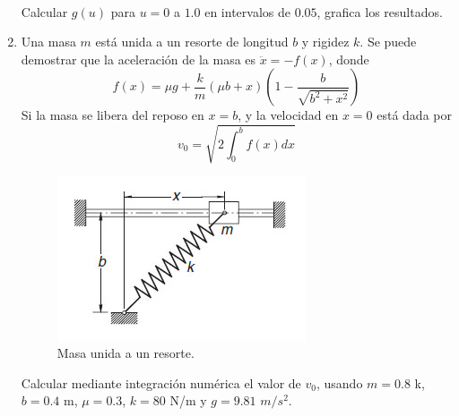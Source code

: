 \documentclass[11pt]{article}
\begin{document}
\begin{enumerate}
\begin{minipage}{4cm}
\end{minipage}
\\
Calcular $g(u)$ para $u=0$ a $1.0$ en intervalos de $0.05$, grafica los resultados.
\item Una masa $m$ est\'{a} unida a un resorte de longitud $b$ y rigidez $k$. Se puede demostrar que la aceleración de la masa es $\ddot{x} = -f(x)$, donde
\[f(x) = \mu g + \dfrac{k}{m} (\mu b + x) \left( 1 - \dfrac{b}{\sqrt{b^{2} + x^{2}}} \right)\]
Si la masa se libera del reposo en $x=b$, y la velocidad en $x=0$ est\'{a} dada por
\[ v_{0} = \sqrt{2 \int_{0}^{b} f(x) dx}\]
\begin{figure}[H]
	\centering
	\includegraphics[scale=0.5]{Imagenes/Integral_02_Resorte.jpg}
	\caption{Masa unida a un resorte.}
\end{figure}
Calcular mediante integración numérica el valor de $v_{0}$, usando $m=0.8$ k, $b=0.4$ m, $\mu=0.3$, $k=80$ N/m y $g=9.81$ $m/s^{2}$.
\end{enumerate}
\end{document}
